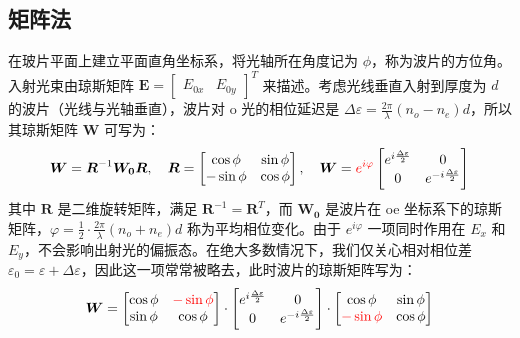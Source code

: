 \documentclass[UTF8]{report}
\theoremstyle{MyLineTheoremStyle} %
\theoremstyle{MyBlockTheoremStyle} %
\theoremstyle{MySubsubsectionStyle} %
\begin{document}
\subsection{矩阵法}
在玻片平面上建立平面直角坐标系，将光轴所在角度记为 $\phi$，称为波片的方位角。入射光束由琼斯矩阵 $\boldsymbol{E} = \begin{bmatrix}
    E_{0x} & 
    E_{0y}
\end{bmatrix}^T$ 来描述。考虑光线垂直入射到厚度为 $d$ 的波片（光线与光轴垂直），波片对 o 光的相位延迟是 $\Delta \varepsilon = \frac{2\pi}{\lambda}(n_o - n_e) d$，所以其琼斯矩阵 $\boldsymbol{W}$ 可写为：
\begin{equation}
\boldsymbol{W} = \boldsymbol{R}^{-1} \boldsymbol{W_0} \boldsymbol{R},\quad \boldsymbol{R} = 
\begin{bmatrix}
    \cos \phi & \sin \phi \\ 
    - \sin \phi & \cos \phi
\end{bmatrix},\quad \boldsymbol{W} =
{\color{red} e^{i\varphi}}\begin{bmatrix}
    e^{i\frac{\Delta \varepsilon}{2}} & 0 \\ 
    0 & e^{-i\frac{\Delta \varepsilon}{2}}
\end{bmatrix}
\end{equation}
其中 $\boldsymbol{R}$ 是二维旋转矩阵，满足 $\boldsymbol{R}^{-1} = \boldsymbol{R}^T$，而 $\boldsymbol{W_0}$ 是波片在 oe 坐标系下的琼斯矩阵，$\varphi = \frac{1}{2}\cdot \frac{2 \pi }{\lambda} (n_o + n_e) d$ 称为平均相位变化。由于 $e^{i\varphi}$ 一项同时作用在 $E_x$ 和 $E_y$，不会影响出射光的偏振态。在绝大多数情况下，我们仅关心相对相位差 $\varepsilon_0 =  \varepsilon + \Delta \varepsilon$，因此这一项常常被略去，此时波片的琼斯矩阵写为：
\begin{equation}
    \boldsymbol{W} = 
    \begin{bmatrix}
        \cos \phi & {\color{red} - \sin \phi } \\ 
         \sin \phi & \cos \phi
    \end{bmatrix}\cdot 
    \begin{bmatrix}
        e^{i\frac{\Delta \varepsilon}{2}} & 0 \\ 
        0 & e^{-i\frac{\Delta \varepsilon}{2}}
    \end{bmatrix}
    \cdot
    \begin{bmatrix}
        \cos \phi & \sin \phi \\ 
        {\color{red} - \sin  \phi} & \cos \phi
    \end{bmatrix}
\end{equation}
\end{document}

